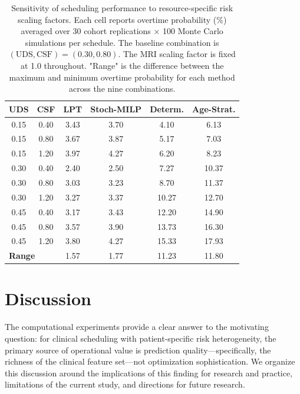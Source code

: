 \documentclass[11pt,a4paper]{article}
\begin{document}
\begin{table}[htbp]
\centering
\caption{Sensitivity of scheduling performance to resource-specific risk scaling factors. Each cell reports overtime probability (\%) averaged over 30 cohort replications $\times$ 100 Monte Carlo simulations per schedule. The baseline combination is $(\text{UDS}, \text{CSF}) = (0.30, 0.80)$. The MRI scaling factor is fixed at 1.0 throughout. "Range" is the difference between the maximum and minimum overtime probability for each method across the nine combinations.}
\label{tab:scaling_sensitivity}
\begin{tabular}{@{}cc cccc@{}}
\toprule
\textbf{UDS} & \textbf{CSF} & \textbf{LPT} & \textbf{Stoch-MILP} & \textbf{Determ.} & \textbf{Age-Strat.} \\
\midrule
0.15 & 0.40 & 3.43 & 3.70 & 4.10  & 6.13 \\
0.15 & 0.80 & 3.67 & 3.87 & 5.17  & 7.03 \\
0.15 & 1.20 & 3.97 & 4.27 & 6.20  & 8.23 \\
0.30 & 0.40 & 2.40 & 2.50 & 7.27  & 10.37 \\
0.30 & 0.80 & 3.03 & 3.23 & 8.70  & 11.37 \\
0.30 & 1.20 & 3.27 & 3.37 & 10.27 & 12.70 \\
0.45 & 0.40 & 3.17 & 3.43 & 12.20 & 14.90 \\
0.45 & 0.80 & 3.57 & 3.90 & 13.73 & 16.30 \\
0.45 & 1.20 & 3.80 & 4.27 & 15.33 & 17.93 \\
\midrule
\multicolumn{2}{l}{\textbf{Range}}     & 1.57 & 1.77 & 11.23 & 11.80 \\
\bottomrule
\end{tabular}
\end{table}




\section{Discussion}
\label{sec:discussion}

The computational experiments provide a clear answer to the motivating question: for clinical scheduling with patient-specific risk heterogeneity, the primary source of operational value is prediction quality---specifically, the richness of the clinical feature set---not optimization sophistication. We organize this discussion around the implications of this finding for research and practice, limitations of the current study, and directions for future research.
\end{document}
